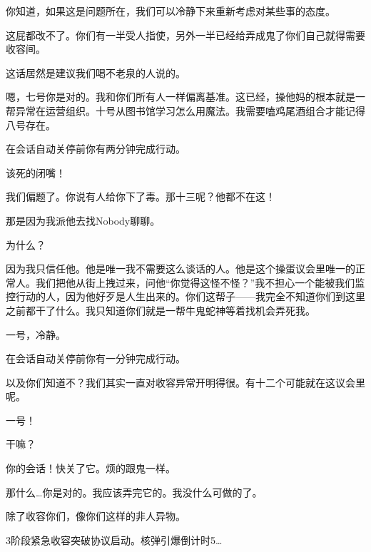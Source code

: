 \begin{scpbox}
你知道，如果这是问题所在，我们可以冷静下来重新考虑对某些事的态度。

这屁都改不了。你们有一半受人指使，另外一半已经给弄成鬼了你们自己就得需要收容间。

这话居然是建议我们喝不老泉的人说的。

嗯，七号你是对的。我和你们所有人一样偏离基准。这已经，操他妈的根本就是一帮异常在运营组织。十号从图书馆学习怎么用魔法。我需要嗑鸡尾酒组合才能记得八号存在。

在会话自动关停前你有两分钟完成行动。

\ii{{[}朝电脑]} 该死的闭嘴！

我们偏题了。你说有人给你下了毒。那十三呢？他都不在这！

那是因为我派他去找Nobody聊聊。

为什么？

因为我只信任他。他是唯一我不需要这么谈话的人。他是这个操蛋议会里唯一的正常人。我们把他从街上拽过来，问他“你觉得这怪不怪？”我不担心一个能被我们监控行动的人，因为他好歹是人生出来的。你们这帮子——我完全不知道你们到这里之前都干了什么。我只知道你们就是一帮牛鬼蛇神等着找机会弄死我。

一号，冷静。

在会话自动关停前你有一分钟完成行动。

以及你们知道不？我们其实一直对收容异常开明得很。有十二个可能就在这议会里呢。

一号！

干嘛？

你的会话！快关了它。烦的跟鬼一样。

那什么…你是对的。我应该弄完它的。我没什么可做的了。


除了收容你们，像你们这样的非人异物。

3阶段紧急收容突破协议启动。核弹引爆倒计时5…

\end{scpbox}
